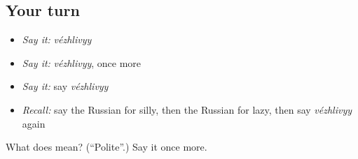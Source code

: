 \subsection*{Your turn}
\begin{itemize}
\raggedright
  \item \emph{Say it:} \emph{vézhlivyy}
  \item \emph{Say it:} \emph{vézhlivyy}, once more
  \item \emph{Say it:} say \emph{vézhlivyy}
  \item \emph{Recall:} say the Russian for silly, then the Russian for lazy, then say \emph{vézhlivyy} again
\end{itemize}

\begin{tcolorbox}[breakable,colback=teal!4,colframe=teal!35!black,title={Before you move on}]
What does  mean? (\textquotedblleft{}Polite\textquotedblright{}.) Say it once more.
\end{tcolorbox}
